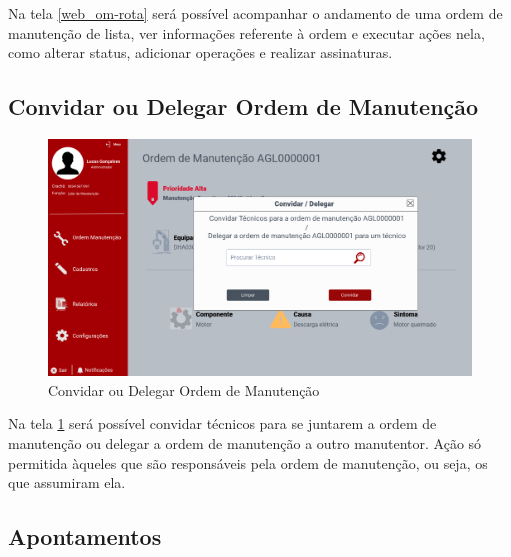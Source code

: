{	Na tela \ref{web_om-rota} será possível acompanhar o andamento de uma ordem de manutenção de lista, ver informações referente à ordem e executar ações nela, como alterar status, adicionar operações e realizar assinaturas.
	
	\newpage
	\subsection{Convidar ou Delegar Ordem de Manutenção}
	
	\begin{figure}[htb]
		\caption{\label{web_om-convidar-delegar}Convidar ou Delegar Ordem de Manutenção}
		\begin{center}
			\includegraphics[scale=0.40]{./Figuras/web/om-convidar-delegar.png}
		\end{center}
	\end{figure}
	
	Na tela \ref{web_om-convidar-delegar} será possível convidar técnicos para se juntarem a ordem de manutenção ou delegar a ordem de manutenção a outro manutentor. Ação só permitida àqueles que são responsáveis pela ordem de manutenção, ou seja, os que assumiram ela.
	
	\newpage
	\subsection{Apontamentos}
	
}
